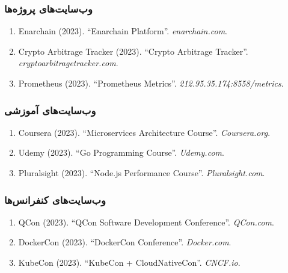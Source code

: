 \documentclass[
]{article}
\begin{document}
\subsubsection{وب‌سایت‌های
پروژه‌ها}\label{ux648ux628ux633ux627ux6ccux62aux647ux627ux6cc-ux67eux631ux648ux698ux647ux647ux627}

\begin{enumerate}
\def\labelenumi{\arabic{enumi}.}
\setcounter{enumi}{63}
\item
  Enarchain (2023). ``Enarchain Platform''. \emph{enarchain.com}.
\item
  Crypto Arbitrage Tracker (2023). ``Crypto Arbitrage Tracker''.
  \emph{cryptoarbitragetracker.com}.
\item
  Prometheus (2023). ``Prometheus Metrics''.
  \emph{212.95.35.174:8558/metrics}.
\end{enumerate}

\subsubsection{وب‌سایت‌های
آموزشی}\label{ux648ux628ux633ux627ux6ccux62aux647ux627ux6cc-ux622ux645ux648ux632ux634ux6cc}

\begin{enumerate}
\def\labelenumi{\arabic{enumi}.}
\setcounter{enumi}{66}
\item
  Coursera (2023). ``Microservices Architecture Course''.
  \emph{Coursera.org}.
\item
  Udemy (2023). ``Go Programming Course''. \emph{Udemy.com}.
\item
  Pluralsight (2023). ``Node.js Performance Course''.
  \emph{Pluralsight.com}.
\end{enumerate}

\subsubsection{وب‌سایت‌های
کنفرانس‌ها}\label{ux648ux628ux633ux627ux6ccux62aux647ux627ux6cc-ux6a9ux646ux641ux631ux627ux646ux633ux647ux627}

\begin{enumerate}
\def\labelenumi{\arabic{enumi}.}
\setcounter{enumi}{69}
\item
  QCon (2023). ``QCon Software Development Conference''.
  \emph{QCon.com}.
\item
  DockerCon (2023). ``DockerCon Conference''. \emph{Docker.com}.
\item
  KubeCon (2023). ``KubeCon + CloudNativeCon''. \emph{CNCF.io}.
\end{enumerate}
\end{document}

